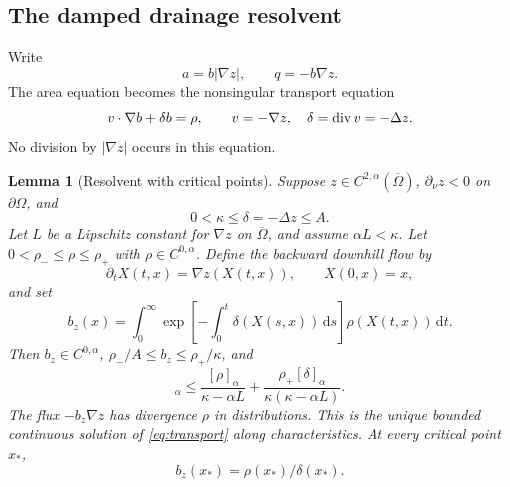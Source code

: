 \documentclass[11pt,a4paper]{article}
\newtheorem{lemma}[theorem]{Lemma}
\theoremstyle{definition}\newtheorem{definition}[theorem]{Definition}
\theoremstyle{remark}\newtheorem{remark}[theorem]{Remark}
\newcommand{\dd}{\,\mathrm d}
\newcommand{\cl}{\overline}
\begin{document}
\subsection{The damped drainage resolvent}
Write
\begin{equation}
 a=b|\nabla z|,\qquad q=-b\nabla z.\label{eq:bchange}
\end{equation}
The area equation becomes the nonsingular transport equation
\begin{equation}
 v\cdot\nabla b+\delta b=\rho,\qquad v=-\nabla z,\quad \delta=\operatorname{div} v=-\Delta z.\label{eq:transport}
\end{equation}
No division by $|\nabla z|$ occurs in this equation.

\begin{lemma}[Resolvent with critical points]\label{lem:resolvent}
Suppose $z\in C^{2,\alpha}(\cl\Omega)$, $\partial_\nu z<0$ on $\partial\Omega$, and
\[
 0<\kappa\leq\delta=-\Delta z\leq A.
\]
Let $L$ be a Lipschitz constant for $\nabla z$ on $\cl\Omega$, and assume $\alpha L<\kappa$. Let $0<\rho_-\leq\rho\leq\rho_+$ with $\rho\in C^{0,\alpha}$. Define the backward downhill flow by
\[
 \partial_t X(t,x)=\nabla z(X(t,x)),\qquad X(0,x)=x,
\]
and set
\begin{equation}
 b_z(x)=\int_0^\infty
 \exp\!\left[-\int_0^t\delta(X(s,x))\dd s\right]\rho(X(t,x))\dd t.\label{eq:resolvent}
\end{equation}
Then $b_z\in C^{0,\alpha}$, $\rho_-/A\leq b_z\leq\rho_+/\kappa$, and
\begin{equation}
 [b_z]_\alpha\leq
 \frac{[\rho]_\alpha}{\kappa-\alpha L}
 +\frac{\rho_+[\delta]_\alpha}{\kappa(\kappa-\alpha L)}.\label{eq:holderb}
\end{equation}
The flux $-b_z\nabla z$ has divergence $\rho$ in distributions. This is the unique bounded continuous solution of \eqref{eq:transport} along characteristics. At every critical point $x_*$,
\begin{equation}
 b_z(x_*)=\rho(x_*)/\delta(x_*).\label{eq:criticalb}
\end{equation}
\end{lemma}
\end{document}
